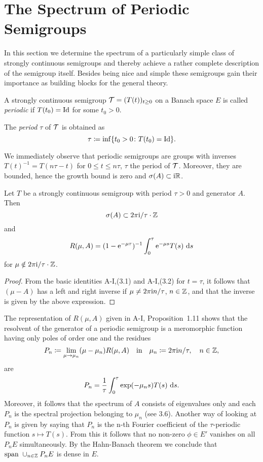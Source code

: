 \section{The Spectrum of Periodic Semigroups} \label{sec:a3-5}
In this section we determine the spectrum of a particularly simple class of strongly continuous semigroups and thereby achieve a rather complete description of the semigroup itself.
Besides being nice and simple these semigroups gain their importance as building blocks for the general theory.
\begin{definition}\label{def:a3-5.1}
A strongly continuous semigroup $\mathcal{T} = (T(t))_{t \geq 0}$ on a Banach space $E$ is called \emph{periodic} if $T(t_{0}) = \operatorname{Id}$ for some $t_{0} > 0$.

The \emph{period} $\tau$ of $\mathcal{T}$ is obtained as 
%
\[
	\tau \coloneqq \inf\{t_{0} > 0 \colon T(t_{0}) = \operatorname{Id}\} .
\]
%
\end{definition}
We immediately observe that periodic semigroups are groups with inverses $T(t)^{-1} = T(n\tau-t)$ for $0 \leq t \leq n\tau$, $\tau$ the period of $\mathcal{T}$.
Moreover, they are bounded, hence the growth bound is zero and $\sigma(A) \subset \mathrm{i}\mathbb{R}$.
\begin{lemma}\label{lem:a3-5.2}
Let $T$ be a strongly continuous semigroup with period $\tau > 0$ and generator $A$.
Then
\[
\sigma(A) \subset 2\pi \mathrm{i}/\tau\cdot\mathbb{Z}
\]
and
\begin{equation}\label{eq:a3-5.1}
R(\mu,A) = (1-\mathrm{e}^{-\mu\tau})^{-1} \int_{0}^{\tau}\mathrm{e}^{-\mu s}T(s) \, \mathop{}\!\mathrm{d}{s}
\end{equation}
for $\mu \notin 2\pi\mathrm{i} /\tau\cdot\mathbb{Z}$.
\end{lemma}
\begin{proof}
From the basic identities A-I,(3.1) and A-I,(3.2) for $t = \tau$, it follows that $(\mu - A)$ has a left and right inverse if $\mu \neq 2\pi\mathrm{i} n/\tau$, $n \in \mathbb{Z}$, and that the inverse is given by the above expression.
\end{proof}
The representation of $R(\mu,A)$ given in A-I, Proposition~1.11 shows that the resolvent of the generator of a periodic semigroup is a meromorphic function having only poles of order one and the residues
\[
P_{n} \coloneqq \lim_{\mu \to \mu_{n}} (\mu-\mu_{n})R(\mu,A) \quad \text{in} \quad \mu_{n} \coloneqq 2\pi\mathrm{i} n/\tau, \quad n \in \mathbb{Z} ,
\]
are
\begin{equation}\label{eq:a3-5.2}
P_{n} = \frac{1}{\tau}\int_{0}^{\tau}\exp(-\mu_{n}s)T(s) \, \mathop{}\!\mathrm{d}{s} .
\end{equation}
Moreover, it follows that the spectrum of $A$ consists of eigenvalues only and each $P_{n}$ is the spectral projection belonging to $\mu_{n}$ (see 3.6). 
Another way of looking at $P_{n}$ is given by saying that $P_{n}$ is the n-th Fourier coefficient of the $\tau$-periodic function $s \mapsto T(s)$.
From this it follows that no non-zero $\phi \in E'$ vanishes on all $P_{n}E$ simultaneously.
By the Hahn-Banach theorem we conclude that $\text{span } \cup_{n \in \mathbb{Z}} P_{n}E$ is dense in $E$.

